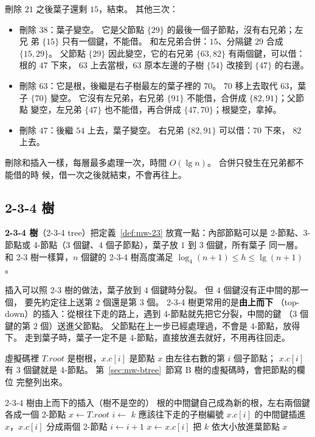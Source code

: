刪除 $21$ 之後葉子還剩 $15$，結束。 其他三次：
\begin{itemize}
\item 刪除 $38$：葉子變空。 它是父節點 $\{29\}$ 的最後一個子節點，沒有右兄弟；左兄
弟 $\{15\}$ 只有一個鍵，不能借。 和左兄弟合併：$15$、分隔鍵 $29$ 合成 $\{15, 29\}$。
父節點 $\{29\}$ 因此變空，它的右兄弟 $\{63, 82\}$ 有兩個鍵，可以借：根的 $47$ 下來，
$63$ 上去當根，$63$ 原本左邊的子樹 $\{54\}$ 改接到 $\{47\}$ 的右邊。
\item 刪除 $63$：它是根，後繼是右子樹最左的葉子裡的 $70$。 $70$ 移上去取代 $63$，葉
子 $\{70\}$ 變空。 它沒有左兄弟，右兄弟 $\{91\}$ 不能借，合併成 $\{82, 91\}$；父節點
變空，左兄弟 $\{47\}$ 也不能借，再合併成 $\{47, 70\}$；根變空，拿掉。
\item 刪除 $47$：後繼 $54$ 上去，葉子變空。 右兄弟 $\{82, 91\}$ 可以借：$70$ 下來，
$82$ 上去。
\end{itemize}

刪除和插入一樣，每層最多處理一次，時間 $O(\lg n)$。 合併只發生在兄弟都不能借的時
候，借一次之後就結束，不會再往上。

\subsection{2-3-4 樹}
\label{sec:mw-234}

\textbf{2-3-4 樹}（2-3-4 tree）把定義~\ref{def:mw-23} 放寬一點：內部節點可以是
2-節點、3-節點或 4-節點（$3$ 個鍵、$4$ 個子節點），葉子放 $1$ 到 $3$ 個鍵，所有葉子
同一層。 和 2-3 樹一樣算，$n$ 個鍵的 2-3-4 樹高度滿足
$\log_4(n + 1) \le h \le \lg(n + 1)$。

插入可以照 2-3 樹的做法，葉子放到 $4$ 個鍵時分裂。 但 $4$ 個鍵沒有正中間的那一個，
要先約定往上送第 $2$ 個還是第 $3$ 個。 2-3-4 樹更常用的是\textbf{由上而下}
（top-down）的插入：從根往下走的路上，遇到 4-節點就先把它分裂，中間的鍵
（$3$ 個鍵的第 $2$ 個）送進父節點。 父節點在上一步已經處理過，不會是 4-節點，放得
下。 走到葉子時，葉子一定不是 4-節點，直接放進去就好，不用再往回走。

虛擬碼裡 $T.\mathit{root}$ 是樹根，$x.c[i]$ 是節點 $x$ 由左往右數的第 $i$ 個子節點；
$x.c[i]$ 有 $3$ 個鍵就是 4-節點。 第~\ref{sec:mw-btree}~節寫 B 樹的虛擬碼時，會把節點的欄位
完整列出來。

\begin{pseudo}[label=alg:mw-234-insert]{2-3-4 樹由上而下的插入（樹不是空的）}
        \State 根的中間鍵自己成為新的根，左右兩個鍵各成一個 2-節點
    \EndIf
    \State $x \gets T.\mathit{root}$
        \State $i \gets$ $k$ 應該往下走的子樹編號
            \State $x.c[i]$ 的中間鍵插進 $x$，$x.c[i]$ 分成兩個 2-節點
                \State $i \gets i + 1$
            \EndIf
        \EndIf
        \State $x \gets x.c[i]$
    \EndWhile
    \State 把 $k$ 依大小放進葉節點 $x$
\EndProcedure
\end{pseudo}

